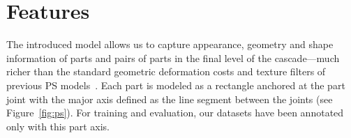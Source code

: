 \chapter{Features}\label{features}



The introduced \CPS model allows us to capture appearance, geometry and shape information of parts and pairs of parts in the final level of the cascade---much richer than the standard geometric deformation costs and texture filters of previous PS models~\cite{felz05,devacrf,ferrari08,andriluka09}.  
Each part is modeled as a rectangle anchored at the part joint with the major axis defined as the line segment between the joints (see Figure~\ref{fig:ps}).  For training and evaluation, our datasets have been annotated only with this part axis.



